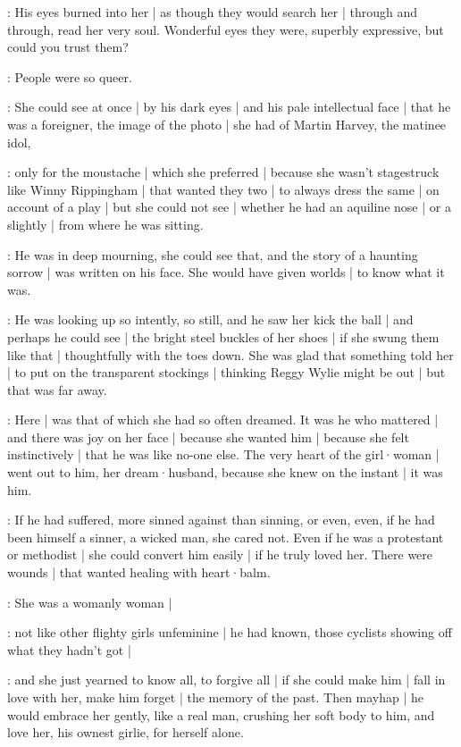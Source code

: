 \gertyNovel:
His eyes burned into her |
as though they would search her |
through and through,
read her very soul.
Wonderful eyes they were,
superbly expressive,
but could you trust them?

\gertyReal:
People were so queer.

\gertyNovel:
She could see at once |
by his dark eyes |
and his pale intellectual face |
that he was a foreigner,
the image of the photo |
she had of Martin Harvey,
the matinee idol,

\gertyReal:
only for the moustache |
which she preferred |
because she wasn't stagestruck like Winny Rippingham |
that wanted they two |
to always dress the same |
on account of a play |
but she could not see |%
whether he had an aquiline nose |
or a slightly  |
from where he was sitting.

\gertyNovel:
He was in deep mourning,
she could see that,
and the story of a haunting sorrow |
was written on his face.
She would have given worlds |
to know what it was.

\gertySex:
He was looking up so intently,
so still,
and he saw her kick the ball |
and perhaps he could see |
the bright steel buckles of her shoes |
if she swung them like that |
thoughtfully with the toes down.
She was glad that something told her |
to put on the transparent stockings |
thinking Reggy Wylie might be out |
but that was far away.

\gertySex:
Here |
was that of which she had so often dreamed.
It was he who mattered |
and there was joy on her face |
because she wanted him |
because she felt instinctively |
that he was like no-one else.%
The very heart of the girl·woman |
went out to him,
her dream·husband,
because she knew on the instant |
it was him.

\gertyNovel:
If he had suffered,
more sinned against than sinning,
or even,
even,
if he had been himself a sinner,
a wicked man,
she cared not.
Even if he was a protestant or methodist |
she could convert him easily |
if he truly loved her.
There were wounds |
that wanted healing with heart·balm.

\gertySex:
She was a womanly woman |

\gertyJudgy:
not like other flighty girls unfeminine |
he had known,
those cyclists showing off what they hadn't got |

\gertySex:
and she just yearned to know all,
to forgive all |
if she could make him |
fall in love with her,
make him forget |
the memory of the past.
Then mayhap |
he would embrace her gently,
like a real man,
crushing her soft body to him,%
and love her,
his ownest girlie,
for herself alone.

